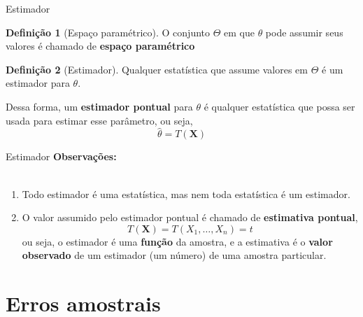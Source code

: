 \documentclass[10pt]{beamer}\usepackage[]{graphicx}\usepackage[]{color}
\newcommand{\mb}[1]{\mathbf{#1}}
\theoremstyle{definition}
\newtheorem*{mydef}{Definição}
\begin{document}
\begin{frame}[fragile]{Estimador}
  \begin{mydef}[Espaço paramétrico]
    O conjunto $\Theta$ em que $\theta$ pode assumir seus valores é
    chamado de \textbf{espaço paramétrico}
  \end{mydef}
  \begin{mydef}[Estimador]
    Qualquer estatística que assume valores em $\Theta$ é um estimador
    para $\theta$.
  \end{mydef}
  Dessa forma, um \textbf{estimador pontual} para $\theta$ é qualquer
  estatística que possa ser usada para estimar esse parâmetro, ou seja,
  \begin{equation*}
    \hat{\theta} = T(\mb{X})
  \end{equation*}
\end{frame}

\begin{frame}[fragile]{Estimador}
  \textbf{Observações:} \\~\\
  \begin{enumerate}
  \item Todo estimador é uma estatística, mas nem toda estatística é um
    estimador.
  \item O valor assumido pelo estimador pontual é chamado de
    \textbf{estimativa pontual},
    \begin{equation*}
      T(\mb{X}) = T(X_1, \ldots, X_n) = t
    \end{equation*}
    ou seja, o estimador é uma \textbf{função} da amostra, e a estimativa
    é o \textbf{valor observado} de um estimador (um número) de uma
    amostra particular.
  \end{enumerate}
\end{frame}

\section{Erros amostrais}
\end{document}
